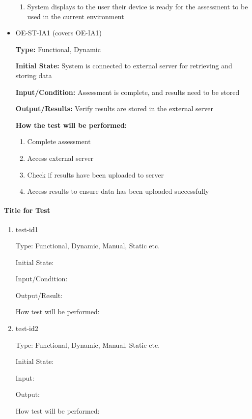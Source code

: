 \documentclass[12pt, titlepage]{article}
\begin{document}
\begin{itemize}
\begin{mdframed}[linewidth=0.5mm]
\begin{enumerate}[noitemsep]
        \item System displays to the user their device is ready for the assessment to be used in the current environment
      \end{enumerate}
  \end{mdframed}
  \item OE-ST-IA1 (covers OE-IA1)
  \begin{mdframed}[linewidth=0.5mm]
      \textbf{Type:} Functional, Dynamic \par
      \textbf{Initial State:} System is connected to external server for retrieving and storing data \par
      \textbf{Input/Condition:} Assessment is complete, and results need to be stored\par
      \textbf{Output/Results:} Verify results are stored in the external server \par
      \textbf{How the test will be performed:}
      \begin{enumerate}[noitemsep]
        \item Complete assessment
        \item Access external server
        \item Check if results have been uploaded to server
        \item Access results to ensure data has been uploaded successfully
      \end{enumerate}
  \end{mdframed}
\end{itemize}
		
\paragraph{Title for Test}

\begin{enumerate}

\item{test-id1\\}

Type: Functional, Dynamic, Manual, Static etc.
					
Initial State: 
					
Input/Condition: 
					
Output/Result: 
					
How test will be performed: 
					
\item{test-id2\\}

Type: Functional, Dynamic, Manual, Static etc.
					
Initial State: 
					
Input: 
					
Output: 
					
How test will be performed: 

\end{enumerate}
\end{document}
